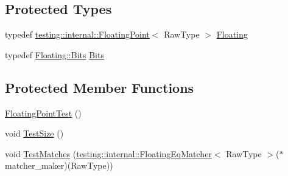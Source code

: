 \subsection*{Protected Types}
\begin{DoxyCompactItemize}
\item 
typedef \hyperlink{classtesting_1_1internal_1_1_floating_point}{testing\+::internal\+::\+Floating\+Point}$<$ Raw\+Type $>$ \hyperlink{classtesting_1_1gmock__matchers__test_1_1_floating_point_test_ae1459f93e1b18426625daf4fa98e80c6}{Floating}
\item 
typedef \hyperlink{classtesting_1_1internal_1_1_floating_point_abf228bf6cd48f12c8b44c85b4971a731}{Floating\+::\+Bits} \hyperlink{classtesting_1_1gmock__matchers__test_1_1_floating_point_test_addf899bd832ae51103198d201d2f2ea2}{Bits}
\end{DoxyCompactItemize}
\subsection*{Protected Member Functions}
\begin{DoxyCompactItemize}
\item 
\hyperlink{classtesting_1_1gmock__matchers__test_1_1_floating_point_test_af2fb52db3abf63903d78541c4c3a17d3}{Floating\+Point\+Test} ()
\item 
void \hyperlink{classtesting_1_1gmock__matchers__test_1_1_floating_point_test_ad6f8f0f5c939b7447a5717620b728018}{Test\+Size} ()
\item 
void \hyperlink{classtesting_1_1gmock__matchers__test_1_1_floating_point_test_a69d14d66bbd82f6b8bbe985046b59538}{Test\+Matches} (\hyperlink{classtesting_1_1internal_1_1_floating_eq_matcher}{testing\+::internal\+::\+Floating\+Eq\+Matcher}$<$ Raw\+Type $>$($\ast$matcher\+\_\+maker)(Raw\+Type))
\end{DoxyCompactItemize}
